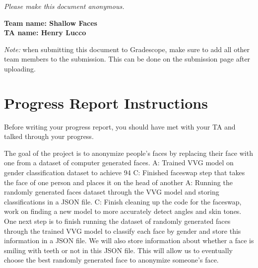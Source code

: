 \emph{Please make this document anonymous.}

\textbf{Team name: Shallow Faces}\\
\textbf{TA name: Henry Lucco}

\emph{Note:} when submitting this document to Gradescope, make sure to add all other team members to the submission. This can be done on the submission page after uploading.

\section*{Progress Report Instructions}

Before writing your progress report, you should have met with your TA and talked through your progress.

%
The goal of the project is to anonymize people's faces by replacing their face with one from a dataset of computer generated faces.
% 
%
A: Trained VVG model on gender classification dataset to achieve 94%
C: Finished faceswap step that takes the face of one person and places it on the head of another 
% 
A: Running the randomly generated faces dataset through the VVG model and storing classifications in a JSON file.  
C: Finish cleaning up the code for the faceswap, work on finding a new model to more accurately detect angles and skin tones. 
%
%
One next step is to finish running the dataset of randomly generated faces through the trained VVG model to classify each face by gender and store this information in a JSON file. We will also store information about whether a face is smiling with teeth or not in this JSON file. This will allow us to eventually choose the best randomly generated face to anonymize someone's face. 
%


